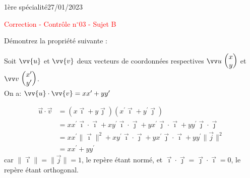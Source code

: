 \documentclass[a4paper,12pt]{article}        %
\begin{document}
\graphicspath{{../images/}}
\pagestyle{empty}
\vspace*{-1.5cm}
1ère spécialité\phantom{xxxxxxxxxxxxxxxxxxxxxxxxxxxxxxxxxxxxxxxxxxxxxxxxxxxxxxxxxxxxxxx}27/01/2023
{\begin{center}\Huge{\textcolor{red}{Correction - Contrôle n$^{\circ}$03 - Sujet B}}\end{center}}


Démontrez la propriété suivante :
\begin{propriete}
	Soit $\vv{u}$ et $\vv{v}$ deux vecteurs de coordonnées respectives $\Coord{u}{x}{y}$ et $\Coord{v}{x'}{y'}$.\\
	On a: $\vv{u} \cdot \vv{v}=x x^{\prime}+y y^{\prime}$
\end{propriete}

\begin{corrBox}
	\begin{align*}
		\vec{u} \cdot \vec{v}&=(x \vec{\imath}+y \vec{\jmath})\left(x^{\prime} \vec{\imath}+y^{\prime} \vec{\jmath}\right)\\
		&=x x^{\prime} \vec{\imath} \cdot \vec{\imath}+x y^{\prime} \vec{\imath} \cdot \vec{\jmath}+y x^{\prime} \vec{\jmath} \cdot \vec{\imath}+y y^{\prime} \vec{\jmath} \cdot \vec{\jmath}\\
		&=x x^{\prime}\|\vec{\imath}\|^{2}+x y^{\prime} \vec{\imath} \cdot \vec{\jmath}+y x^{\prime} \vec{\jmath} \cdot \vec{\imath}+y y^{\prime}\|\vec{j}\|^{2}\\
		&=x x^{\prime}+y y^{\prime}
	\end{align*}
	car $\|\vec{\imath}\|=\|\vec{j}\|=1$, le repère étant normé, et $\vec{\imath} \cdot \vec{\jmath}=\vec{\jmath} \cdot \vec{\imath}=0$, le repère étant orthogonal.
\end{corrBox}
\end{document}
